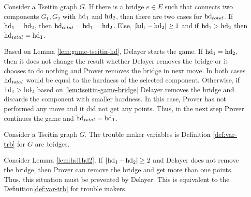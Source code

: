 \documentclass{report}
\begin{document}
\begin{lem}\label{lem:hd1hd2}
Consider a Tseitin graph $G$. If there is a bridge $e \in E$ such that connects two components $G_1,G_2$ with $\operatorname{hd}_1$ and $\operatorname{hd}_2$, then there are two cases for $\operatorname{hd}_{total}$. If $\operatorname{hd}_1= \operatorname{hd}_2$, then $\operatorname{hd}_{total}= \operatorname{hd}_1= \operatorname{hd}_2$. Else, $ \lvert \operatorname{hd}_1- \operatorname{hd}_2  \rvert \geq 1$ and if $ \operatorname{hd}_1 > \operatorname{hd}_2 $  then $\operatorname{hd}_{total}= \operatorname{hd}_1$.
\end{lem}	
\begin{prf}
Based on Lemma \ref{lem:game-tseitin-hd}, Delayer starts the game. If $\operatorname{hd}_1= \operatorname{hd}_2$, then it does not change the result whether Delayer removes the bridge or it chooses to do nothing and Prover removes the bridge in next move. In both cases $\operatorname{hd}_{total}$ would be equal to the hardness of the selected component. Otherwise, if $ \operatorname{hd}_1 > \operatorname{hd}_2 $ based on \ref{lem:tseitin-game-bridge} Delayer removes the bridge and discards the  component with smaller hardness. In this case, Prover has not performed any move and it did not get any points. Thus, in the next step Prover continues the game and  $\operatorname{hd}_{total}= \operatorname{hd}_1$.
\end{prf}

\begin{lem}\label{lem:troubllemk-hd}
Consider a Tseitin graph $G$. The trouble maker variables is Definition \ref{def:var-trb} for $G$ are bridges.
\end{lem}
\begin{prf}
Consider Lemma \ref{lem:hd1hd2}. If $ \lvert \operatorname{hd}_1- \operatorname{hd}_2  \rvert \geq 2$ and Delayer does not remove the bridge, then Prover can remove the bridge and get more than one points. Thus, this situation must be prevented by Delayer. This is equivalent to the Definition\ref{def:var-trb} for trouble makers.
\end{prf}
\end{document}
